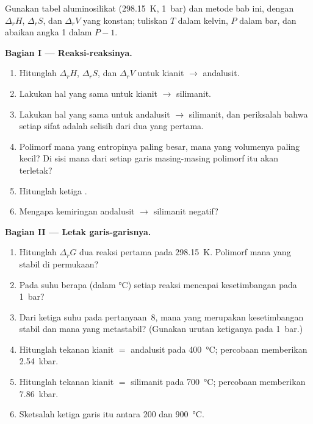 \begin{problem}
\label{pb:b2:metamorphic-facies:1}
Gunakan tabel aluminosilikat (\qty{298.15}{K}, \qty{1}{bar}) dan metode
bab ini, dengan $\Delta_r H$, $\Delta_r S$, dan $\Delta_r V$ yang konstan; tuliskan $T$ dalam
kelvin, $P$ dalam bar, dan abaikan angka 1 dalam $P - 1$.

\noindent\textbf{Bagian I --- Reaksi-reaksinya.}
\begin{enumerate}
\item Hitunglah $\Delta_r H$, $\Delta_r S$, dan $\Delta_r V$ untuk kianit $\to$ andalusit.
\item Lakukan hal yang sama untuk kianit $\to$ silimanit.
\item Lakukan hal yang sama untuk andalusit $\to$ silimanit, dan periksalah bahwa setiap sifat adalah
selisih dari dua yang pertama.
\item Polimorf mana yang entropinya paling besar, mana yang volumenya paling kecil? Di sisi mana
dari setiap garis masing-masing polimorf itu akan terletak?
\item Hitunglah ketiga .
\item Mengapa kemiringan andalusit $\to$ silimanit negatif?
\end{enumerate}

\noindent\textbf{Bagian II --- Letak garis-garisnya.}
\begin{enumerate}[resume]
\item Hitunglah $\Delta_r G$ dua reaksi pertama pada \qty{298.15}{K}. Polimorf
mana yang stabil di permukaan?
\item Pada suhu berapa (dalam \unit{\celsius}) setiap reaksi mencapai kesetimbangan pada
\qty{1}{bar}?
\item Dari ketiga suhu pada pertanyaan~8, mana yang merupakan kesetimbangan stabil dan mana yang
metastabil? (Gunakan urutan ketiganya pada \qty{1}{bar}.)
\item Hitunglah tekanan kianit $=$ andalusit pada \qty{400}{\celsius}; percobaan
memberikan \qty{2.54}{kbar}.
\item Hitunglah tekanan kianit $=$ silimanit pada \qty{700}{\celsius}; percobaan
memberikan \qty{7.86}{kbar}.
\item Sketsalah ketiga garis itu antara 200 dan \qty{900}{\celsius}.
\end{enumerate}


\end{problem}
